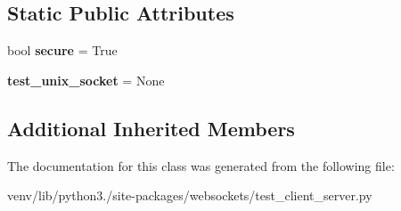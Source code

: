 \subsection*{Static Public Attributes}
\begin{DoxyCompactItemize}
\item 
\mbox{\label{classwebsockets_1_1test__client__server_1_1_s_s_l_client_server_tests_a2d293c191f9d4a49f8a2a334bdb0a44a}} 
bool {\bfseries secure} = True
\item 
\mbox{\label{classwebsockets_1_1test__client__server_1_1_s_s_l_client_server_tests_a01d95164554f542f283c362b4f75cb53}} 
{\bfseries test\+\_\+unix\+\_\+socket} = None
\end{DoxyCompactItemize}
\subsection*{Additional Inherited Members}


The documentation for this class was generated from the following file\+:\begin{DoxyCompactItemize}
\item 
venv/lib/python3./site-\/packages/websockets/test\+\_\+client\+\_\+server.\+py\end{DoxyCompactItemize}
